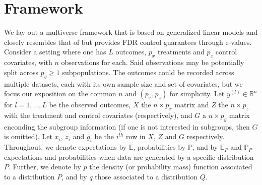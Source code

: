 \documentclass[pdflatex,sn-mathphys-num]{sn-jnl}%
\theoremstyle{thmstyleone}%
\theoremstyle{thmstyletwo}%
\theoremstyle{thmstylethree}%
\begin{document}
\section{Framework}
\label{sec:framework}


We lay out a multiverse framework that is based on generalized linear models and closely resembles that of \cite{semken:2022} but provides FDR control guarantees through e-values.
Consider a setting where one has $L$ outcomes, $p_x$ treatments and $p_z$ control covariates, with $n$ observations for each. Said observations may be potentially split across $p_g \geq 1$ subpopulations.
\color{blue} The outcomes could be recorded across multiple datasets, each with its own sample size and set of covariates, but we focus our exposition on the common $n$ and $(p_x, p_z)$ for simplicity.  \color{black}
Let $y^{(l)} \in \mathbb{R}^n$ for $l=1,\ldots,L$ be the observed outcomes,
$X$ the $n \times p_x$ matrix and $Z$ the $n \times p_z$ with the treatment and control covariates (respectively),
and $G$ a $n \times p_g$ matrix enconding the subgroup information (if one is not interested in subgroups, then $G$ is omitted).
Let $x_i$, $z_i$ and $g_i$ be the $i^{th}$ row in $X$, $Z$ and $G$ respectively.
Throughout, we denote expectations by $\mathbb E$, probabilities by $\mathbb P$, and by $\mathbb E_P$ and $\mathbb P_P$ expectations and probabilities when data are generated by a specific distribution $P$.
Further, we denote by $p$ the density (or probability mass) function associated to a distribution $P$, and by $q$ those associated to a distribution $Q$.
\end{document}
